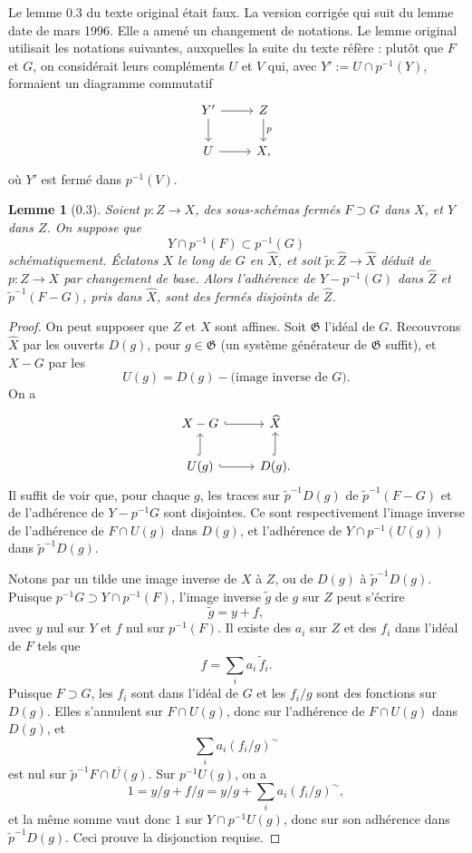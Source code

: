 \documentclass[11pt]{article}
\newtheorem*{lemma}{Lemme}
\newcommand{\cl}[1]{\overline{#1}}
\newcommand{\tw}[1]{\widetilde{#1}}
\newcommand{\wh}[1]{\widehat{#1}}
\begin{document}
Le lemme 0.3 du texte original était faux. La version corrigée qui suit du lemme date de mars 1996. Elle a amené un changement de notations. Le lemme original utilisait les notations suivantes, auxquelles la suite du texte réfère : plutôt que \(F\) et \(G\), on considérait leurs compléments \(U\) et \(V\) qui, avec \(Y' := U\cap p^{-1}(Y)\), formaient un diagramme commutatif
\[
\begin{tikzcd}
Y' \ar[r] \ar[d] & Z \ar[d,"p"] \\
U \ar[r] & X,
\end{tikzcd}
\]
où \(Y'\) est fermé dans \(p^{-1}(V)\).

\begin{lemma}[0.3]
Soient \(p:Z\to X\), des sous-schémas fermés \(F\supset G\) dans \(X\), et \(Y\) dans \(Z\). On suppose que
\[
Y\cap p^{-1}(F)\subset p^{-1}(G)
\]
schématiquement. Éclatons \(X\) le long de \(G\) en \(\wh X\), et soit \(\tw p:\wh Z\to\wh X\) déduit de \(p:Z\to X\) par changement de base. Alors l'adhérence de \(Y-p^{-1}(G)\) dans \(\wh Z\) et \(\tw p^{-1}(F-G)\), pris dans \(\wh X\), sont des fermés disjoints de \(\wh Z\).
\end{lemma}

\begin{proof}
On peut supposer que \(Z\) et \(X\) sont affines. Soit \(\mathfrak G\) l'idéal de \(G\). Recouvrons \(\wh X\) par les ouverts \(D(g)\), pour \(g\in \mathfrak G\) (un système générateur de \(\mathfrak G\) suffit), et \(X-G\) par les
\[
U(g)=D(g)-\text{(image inverse de }G\text{)}.
\]
On a
\[
\begin{tikzcd}
X-G \ar[r,hook] & \wh X \\
U(g) \ar[u,hook] \ar[r,hook] & D(g). \ar[u,hook]
\end{tikzcd}
\]
Il suffit de voir que, pour chaque \(g\), les traces sur \(\tw p^{-1}D(g)\) de \(\tw p^{-1}(F-G)\) et de l'adhérence de \(Y-p^{-1}G\) sont disjointes. Ce sont respectivement l'image inverse de l'adhérence de \(F\cap U(g)\) dans \(D(g)\), et l'adhérence de \(Y\cap p^{-1}(U(g))\) dans \(\tw p^{-1}D(g)\).

Notons par un tilde une image inverse de \(X\) à \(Z\), ou de \(D(g)\) à \(\tw p^{-1}D(g)\). Puisque \(p^{-1}G\supset Y\cap p^{-1}(F)\), l'image inverse \(\tw g\) de \(g\) sur \(Z\) peut s'écrire
\[
\tw g=y+f,
\]
avec \(y\) nul sur \(Y\) et \(f\) nul sur \(p^{-1}(F)\). Il existe des \(a_i\) sur \(Z\) et des \(f_i\) dans l'idéal de \(F\) tels que
\[
f=\sum_i a_i\,\tw f_i.
\]
Puisque \(F\supset G\), les \(f_i\) sont dans l'idéal de \(G\) et les \(f_i/g\) sont des fonctions sur \(D(g)\). Elles s'annulent sur \(F\cap U(g)\), donc sur l'adhérence de \(F\cap U(g)\) dans \(D(g)\), et
\[
\sum_i a_i(f_i/g)^{\sim}
\]
est nul sur \(\tw p^{-1}\cl{F\cap U(g)}\). Sur \(p^{-1}U(g)\), on a
\[
1=y/g+f/g=y/g+\sum_i a_i(f_i/g)^{\sim},
\]
et la même somme vaut donc \(1\) sur \(Y\cap p^{-1}U(g)\), donc sur son adhérence dans \(\tw p^{-1}D(g)\). Ceci prouve la disjonction requise.
\end{proof}
\end{document}
